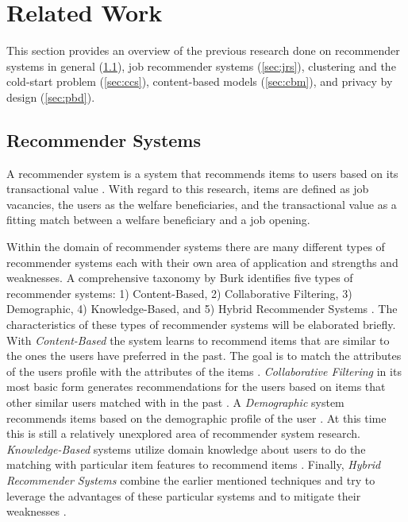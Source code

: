 \section{Related Work}
\label{sec:rel}

This section provides an overview of the previous research done on recommender systems in general (\ref{sec:rs}), job recommender systems (\ref{sec:jrs}), clustering and the cold-start problem (\ref{sec:ccs}), content-based models (\ref{sec:cbm}), and privacy by design (\ref{sec:pbd}).

\subsection{Recommender Systems}
\label{sec:rs}
A recommender system is a system that recommends items to users based on its transactional value \cite{aggarwal2016recommender}. With regard to this research, items are defined as job vacancies, the users as the welfare beneficiaries, and the transactional value as a fitting match between a welfare beneficiary and a job opening.

Within the domain of recommender systems there are many different types of recommender systems each with their own area of application and strengths and weaknesses.
A comprehensive taxonomy by Burk identifies five types of recommender systems: 1) Content-Based, 2) Collaborative Filtering, 3) Demographic, 4) Knowledge-Based, and 5) Hybrid Recommender Systems \cite{Burke2007HybridSystems}.
The characteristics of these types of recommender systems will be elaborated briefly.
With \textit{Content-Based} the system learns to recommend items that are similar to the ones the users have preferred in the past. 
The goal is to match the attributes of the users profile with the attributes of the items  \cite{aggarwal2016recommender}. 
\textit{Collaborative Filtering} in its most basic form generates recommendations for the users based on items that other similar users matched with in the past \cite{Schafer2007}.
A \textit{Demographic} system recommends items based on the demographic profile of the user \cite{Bobadilla2013RecommenderSurvey}.
At this time this is still a relatively unexplored area of recommender system research. \textit{Knowledge-Based} systems utilize domain knowledge about users to do the matching with particular item features to recommend items  \cite{aggarwal2016recommender}. 
Finally, \textit{Hybrid Recommender Systems} combine the earlier mentioned techniques and try to leverage the advantages of these particular systems and to mitigate their weaknesses  \cite{aggarwal2016recommender}.

